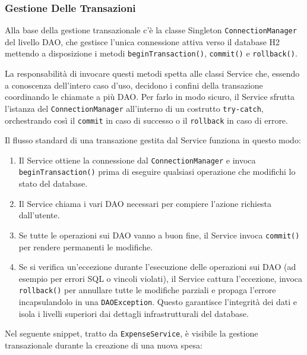 \subsubsection{Gestione Delle Transazioni}
Alla base della gestione transazionale c'è la classe Singleton \texttt{ConnectionManager} del livello DAO, 
che gestisce l'unica connessione attiva verso il database H2 mettendo a disposizione i metodi \texttt{beginTransaction()}, 
\texttt{commit()} e \texttt{rollback()}. 

La responsabilità di invocare questi metodi spetta alle classi Service che, 
essendo a conoscenza dell'intero caso d'uso, decidono i confini della transazione coordinando le chiamate a più DAO. 
Per farlo in modo sicuro, il Service sfrutta l'istanza del \texttt{ConnectionManager} all'interno di un costrutto \texttt{try-catch}, 
orchestrando così il \texttt{commit} in caso di successo o il \texttt{rollback} in caso di errore.

Il flusso standard di una transazione gestita dal Service funziona in questo modo:
\begin{enumerate}
    \item Il Service ottiene la connessione dal \texttt{ConnectionManager} e invoca \texttt{beginTransaction()} prima di eseguire qualsiasi operazione che modifichi lo stato del database.
    \item Il Service chiama i vari DAO necessari per compiere l'azione richiesta dall'utente.
    \item Se tutte le operazioni sui DAO vanno a buon fine, il Service invoca \texttt{commit()} per rendere permanenti le modifiche. 
    \item Se si verifica un'eccezione durante l'esecuzione delle operazioni sui DAO (ad esempio per errori SQL o vincoli violati), 
    il Service cattura l'eccezione, invoca \texttt{rollback()} per annullare tutte le modifiche parziali e propaga l'errore incapsulandolo 
    in una \texttt{DAOException}. Questo garantisce l'integrità dei dati e isola i livelli superiori dai dettagli infrastrutturali del database.  
\end{enumerate}

Nel seguente snippet, tratto da \texttt{ExpenseService}, è visibile la gestione transazionale durante la creazione di una nuova spesa:

